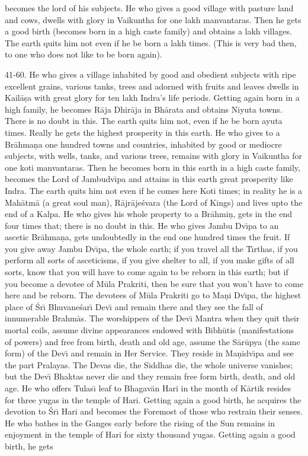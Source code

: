 becomes the lord of his subjects. He who gives a good village with pasture land and cows, dwells with glory in Vaikuntha for one lakh manvantaras. Then he gets a good birth (becomes born in a high caste family) and obtains a lakh villages. The earth quits him not even if he be born a lakh times. (This is very bad then, to one who does not like to be born again).

41-60. He who gives a village inhabited by good and obedient subjects with ripe excellent grains, various tanks, trees and adorned with fruits and leaves dwells in Kail\=a\d{s}a with great glory for ten lakh Indra's life periods. Getting again born in a high family, he becomes R\=aja Dhir\=aja in Bh\=arata and obtains Niyuta towns. There is no doubt in this. The earth quits him not, even if he be born ayuta times. Really he gets the highest prosperity in this earth. He who gives to a Br\=ahma\d{n}a one hundred towns and countries, inhabited by good or mediocre subjects, with wells, tanks, and various trees, remains with glory in Vaikuntha for one koti manvantaras. Then he becomes born in this earth in a high caste family, becomes the Lord of Jambudv\={\i}pa and attains in this earth great prosperity like Indra. The earth quits him not even if he comes here Koti times; in reality he is a Mah\=atm\=a (a great soul man), R\=ajr\=aje\'svara (the Lord of Kings) and lives upto the end of a Kalpa. He who gives his whole property to a Br\=ahmi\d{n}, gets in the end four times that; there is no doubt in this. He who gives Jambu Dv\={\i}pa to an ascetic Br\=ahma\d{n}a, gets undoubtedly in the end one hundred times the fruit. If you give away Jambu Dv\={\i}pa, the whole earth; if you travel all the T\={\i}rthas, if you perform all sorts of asceticisms, if you give shelter to all, if you make gifts of all sorts, know that you will have to come again to be reborn in this earth; but if you become a devotee of M\=ula Prakriti, then be sure that you won't have to come here and be reborn. The devotees of M\=ula Prakriti go to Ma\d{n}i Dv\={\i}pa, the highest place of \'Sr\={\i} Bhuvane\'sar\={\i} Dev\={\i} and remain there and they see the fall of innumerable Brahm\=as. The worshippers of the Dev\={\i} Mantra when they quit their mortal coils, assume divine appearances endowed with Bibh\=utis (manifestations of powers) and free from birth, death and old age, assume the S\=ar\=upya (the same form) of the Dev\={\i} and remain in Her Service. They reside in Ma\d{n}idv\={\i}pa and see the part Pralayas. The Devas die, the Siddhas die, the whole universe vanishes; but the Dev\={\i} Bhaktas never die and they remain free form birth, death, and old age. He who offers Tulas\={\i} leaf to Bhagav\=an Hari in the month of K\=artik resides for three yugas in the temple of Hari. Getting again a good birth, he acquires the devotion to \'Sr\={\i} Hari and becomes the Foremost of those who restrain their senses. He who bathes in the Ganges early before the rising of the Sun remains in enjoyment in the temple of Hari for sixty thousand yugas. Getting again a good birth, he gets

